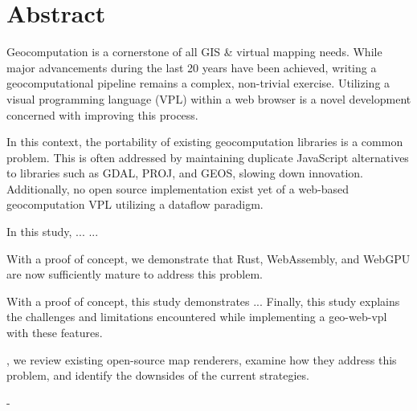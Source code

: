 
























\chapter*{Abstract}
Geocomputation is a cornerstone of all GIS \& virtual mapping needs.
While major advancements during the last 20 years have been achieved, writing a geocomputational pipeline remains a complex, non-trivial exercise. 
Utilizing a visual programming language (VPL) within a web browser is a novel development concerned with improving this process.

In this context, the portability of existing geocomputation libraries is a common problem.
This is often addressed by maintaining duplicate JavaScript alternatives to libraries such as GDAL, PROJ, and GEOS, slowing down innovation.  
Additionally, no open source implementation exist yet of a web-based geocomputation VPL utilizing a dataflow paradigm.

In this study, 
...
...


With a proof of concept, we demonstrate that Rust, WebAssembly, and WebGPU are now sufficiently mature to address this problem.


With a proof of concept, this study demonstrates ...
Finally, this study explains the challenges and limitations encountered while implementing a geo-web-vpl with these features.



, we review existing open-source map renderers, examine how they address this problem, and identify the downsides of the current strategies. 


-

